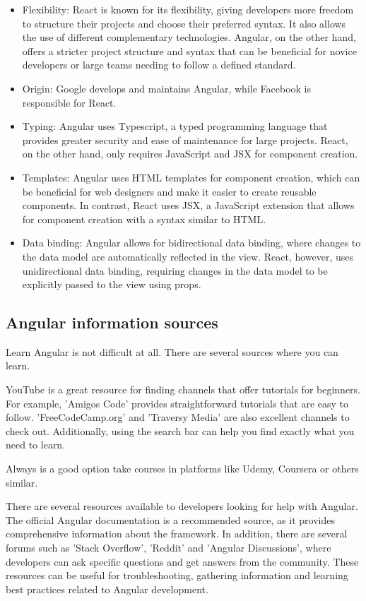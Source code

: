 \documentclass{article}
\begin{document}
\begin{itemize}
  \item Flexibility: React is known for its flexibility, giving developers more freedom to structure their projects and choose their preferred syntax. It also allows the use of different complementary technologies. Angular, on the other hand, offers a stricter project structure and syntax that can be beneficial for novice developers or large teams needing to follow a defined standard.
  \item Origin: Google develops and maintains Angular, while Facebook is responsible for React.
  \item Typing: Angular uses Typescript, a typed programming language that provides greater security and ease of maintenance for large projects. React, on the other hand, only requires JavaScript and JSX for component creation.
  \item Templates: Angular uses HTML templates for component creation, which can be beneficial for web designers and make it easier to create reusable components. In contrast, React uses JSX, a JavaScript extension that allows for component creation with a syntax similar to HTML.
  \item Data binding: Angular allows for bidirectional data binding, where changes to the data model are automatically reflected in the view. React, however, uses unidirectional data binding, requiring changes in the data model to be explicitly passed to the view using props.
\end{itemize}


\subsection{Angular information sources}
Learn Angular is not difficult at all. There are several sources where you can learn. 

YouTube is a great resource for finding channels that offer tutorials for beginners. For example, 'Amigos Code' provides straightforward tutorials that are easy to follow. 'FreeCodeCamp.org' and 'Traversy Media' are also excellent channels to check out. Additionally, using the search bar can help you find exactly what you need to learn.

Always is a good option take courses in platforms like Udemy, Coursera or others similar.

There are several resources available to developers looking for help with Angular. The official Angular documentation is a recommended source, as it provides comprehensive information about the framework. In addition, there are several forums such as 'Stack Overflow', 'Reddit' and 'Angular Discussions', where developers can ask specific questions and get answers from the community. These resources can be useful for troubleshooting, gathering information and learning best practices related to Angular development.
\end{document}
